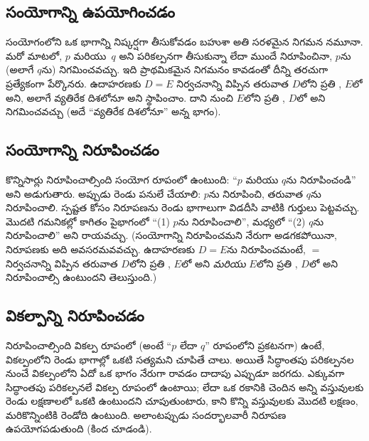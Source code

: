 \documentclass[../../../include/open-logic-section]{subfiles}
\begin{document}
\subsection{సంయోగాన్ని ఉపయోగించడం}

సంయోగంలోని ఒక భాగాన్ని నిష్కర్షగా తీసుకోవడం బహుశా అతి సరళమైన నిగమన నమూనా. మరో మాటలో, $p$ మరియు~$q$ అని పరికల్పనగా తీసుకున్నా లేదా ముందే నిరూపించినా, $p$ను (అలాగే $q$ను) నిగమించవచ్చు. ఇది ప్రాథమికమైన నిగమనం కావడంతో దీన్ని తరచుగా ప్రత్యేకంగా పేర్కొనరు. ఉదాహరణకు $D = E$ నిర్వచనాన్ని విప్పిన తరువాత $D$లోని ప్రతి , $E$లో  అని, అలాగే వ్యతిరేక దిశలోనూ అని స్థాపించాం. దాని నుంచి $E$లోని ప్రతి , $D$లో  అని నిగమించవచ్చు (అదే ``వ్యతిరేక దిశలోనూ'' అన్న భాగం).

\subsection{సంయోగాన్ని నిరూపించడం}

కొన్నిసార్లు నిరూపించాల్సింది సంయోగ రూపంలో ఉంటుంది: ``$p$ మరియు $q$ను నిరూపించండి'' అని అడుగుతారు. అప్పుడు రెండు పనులే చేయాలి: $p$ను నిరూపించి, తరువాత $q$ను నిరూపించాలి. స్పష్టత కోసం నిరూపణను రెండు భాగాలుగా విడదీసి వాటికి గుర్తులు పెట్టవచ్చు. మొదటి గమనికల్లో కాగితం పైభాగంలో ``(1) $p$ను నిరూపించాలి'', మధ్యలో ``(2) $q$ను నిరూపించాలి'' అని రాయవచ్చు. (సంయోగాన్ని నిరూపించమని నేరుగా అడగకపోయినా, నిరూపణకు అది అవసరమవవచ్చు. ఉదాహరణకు $D = E$ను నిరూపించమంటే, $=$ నిర్వచనాన్ని విప్పిన తరువాత $D$లోని ప్రతి , $E$లో  అని \emph{మరియు} $E$లోని ప్రతి , $D$లో  అని నిరూపించాల్సి ఉంటుందని తెలుస్తుంది.)

\subsection{వికల్పాన్ని నిరూపించడం}

నిరూపించాల్సింది వికల్ప రూపంలో (అంటే ``$p$ లేదా $q$'' రూపంలోని ప్రకటనగా) ఉంటే, వికల్పంలోని రెండు భాగాల్లో ఒకటి సత్యమని చూపితే చాలు. అయితే సిద్ధాంతపు పరికల్పనల నుంచే వికల్పంలోని ఏదో ఒక భాగం నేరుగా రావడం దాదాపు ఎప్పుడూ జరగదు. ఎక్కువగా సిద్ధాంతపు పరికల్పనలే వికల్ప రూపంలో ఉంటాయి; లేదా ఒక రకానికి చెందిన అన్ని వస్తువులకు రెండు లక్షణాలలో ఒకటి ఉంటుందని చూపుతుంటారు, కాని కొన్ని వస్తువులకు మొదటి లక్షణం, మరికొన్నింటికి రెండోది ఉంటుంది. అలాంటప్పుడు సందర్భాలవారీ నిరూపణ ఉపయోగపడుతుంది (కింద చూడండి).
\end{document}
